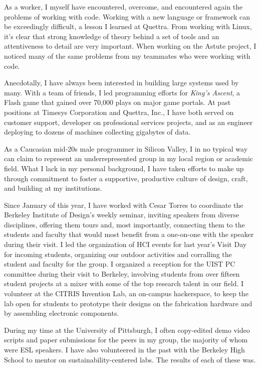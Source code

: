 \documentclass[12pt]{memoir}
\begin{document}

As a worker, I myself have encountered, overcome, and encountered again the problems of working with code.
Working with a new language or framework can be exceedingly difficult, a lesson I learned at Quettra.
From working with Linux, it's clear that strong knowledge of theory behind a set of tools and an attentiveness to detail are very important.
When working on the Astute project, I noticed many of the same problems from my teammates who were working with code.

Anecdotally, I have always been interested in building large systems used by many.
With a team of friends, I led programming efforts for \emph{King's Ascent}, a Flash game that gained over 70,000 plays on major game portals.
At past positions at Timesys Corporation and Quettra, Inc., I have both served on customer support, developer on professional services projects, and as an engineer deploying to dozens of machines collecting gigabytes of data.


As a Caucasian mid-20s male programmer in Silicon Valley, I in no typical way can claim to represent an underrepresented group in my local region or academic field.
What I lack in my personal background, I have taken efforts to make up through commitment to foster a supportive, productive culture of design, craft, and building at my institutions.

Since January of this year, I have worked with Cesar Torres to coordinate the Berkeley Institute of Design's weekly seminar, inviting speakers from diverse disciplines, offering them tours and, most importantly, connecting them to the students and faculty that would most benefit from a one-on-one with the speaker during their visit.
I led the organization of HCI events for last year's Visit Day for incoming students, organizing our outdoor activities and corralling the student and faculty for the group.
I organized a reception for the UIST PC committee during their visit to Berkeley, involving students from over fifteen student projects at a mixer with some of the top research talent in our field.
I volunteer at the CITRIS Invention Lab, an on-campus hackerspace, to keep the lab open for students to prototype their designs on the fabrication hardware and by assembling electronic components.

During my time at the University of Pittsburgh, I often copy-edited demo video scripts and paper submissions for the peers in my group, the majority of whom were ESL speakers.
I have also volunteered in the past with the Berkeley High School to mentor on sustainability-centered labs.
The results of each of these was.
\end{document}
